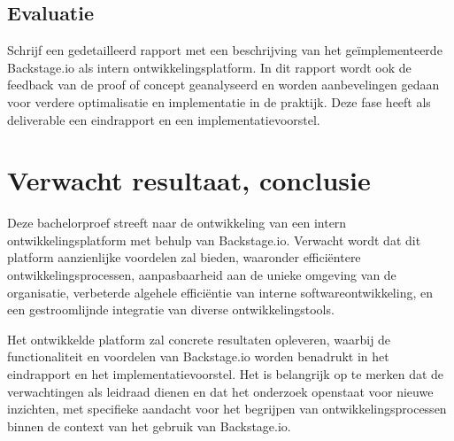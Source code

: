 \subsection{Evaluatie}
Schrijf een gedetailleerd rapport met een beschrijving van het geïmplementeerde Backstage.io als intern ontwikkelingsplatform. In dit rapport wordt ook de feedback van de proof of concept geanalyseerd en worden aanbevelingen gedaan voor verdere optimalisatie en implementatie in de praktijk. Deze fase heeft als deliverable een eindrapport en een implementatievoorstel.

\section{Verwacht resultaat, conclusie}%
\label{sec:verwachte_resultaten}

Deze bachelorproef streeft naar de ontwikkeling van een intern ontwikkelingsplatform met behulp van Backstage.io. Verwacht wordt dat dit platform aanzienlijke voordelen zal bieden, waaronder efficiëntere ontwikkelingsprocessen, aanpasbaarheid aan de unieke omgeving van de organisatie, verbeterde algehele efficiëntie van interne softwareontwikkeling, en een gestroomlijnde integratie van diverse ontwikkelingstools.

Het ontwikkelde platform zal concrete resultaten opleveren, waarbij de functionaliteit en voordelen van Backstage.io worden benadrukt in het eindrapport en het implementatievoorstel. Het is belangrijk op te merken dat de verwachtingen als leidraad dienen en dat het onderzoek openstaat voor nieuwe inzichten, met specifieke aandacht voor het begrijpen van ontwikkelingsprocessen binnen de context van het gebruik van Backstage.io.


